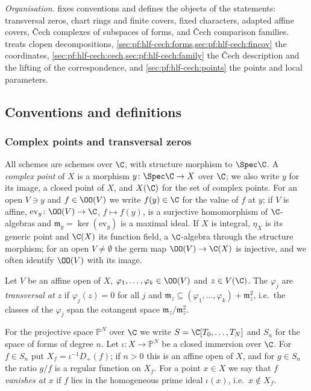 \emph{Organisation.}  fixes conventions and defines the objects of the statements: transversal zeros, chart rings
and finite covers, fixed characters, adapted affine covers, \v{C}ech complexes of subspaces of forms, and \v{C}ech comparison families.
 treats clopen decompositions, \cref{sec:pf:hlf-cech:forms,sec:pf:hlf-cech:fincov} the coordinates,
\cref{sec:pf:hlf-cech:cech,sec:pf:hlf-cech:family} the \v{C}ech description and the lifting of the correspondence, and \cref{sec:pf:hlf-cech:points}
the points and local parameters.

\subsection{Conventions and definitions}\label{sec:pf:hlf-cech:defs}

\subsubsection{Complex points and transversal zeros}
All schemes are schemes over $\C$, with structure morphism to $\Spec\C$. A \emph{complex point} of $X$ is a morphism
$y\colon\Spec\C\to X$ over $\C$; we also write $y$ for its image, a closed point of $X$, and $X(\C)$ for the set of complex points.
For an open $V\ni y$ and $f\in\OO(V)$ we write $f(y)\in\C$ for the value of $f$ at $y$; if $V$ is affine, $\mathrm{ev}_y\colon\OO(V)\to\C$,
$f\mapsto f(y)$, is a surjective homomorphism of $\C$-algebras and $\mathfrak m_y=\ker(\mathrm{ev}_y)$ is a maximal ideal. If $X$ is
integral, $\eta_X$ is its generic point and $\C(X)$ its function field, a $\C$-algebra through the structure morphism; for an open
$V\ne\emptyset$ the germ map $\OO(V)\to\C(X)$ is injective, and we often identify $\OO(V)$ with its image.

\begin{definition}\label{pf:hlf-cech:def:transv}
Let $V$ be an affine open of $X$, $\varphi_1,\dots,\varphi_k\in\OO(V)$ and $z\in V(\C)$. The $\varphi_j$ are \emph{transversal at $z$} if
$\varphi_j(z)=0$ for all $j$ and $\mathfrak m_z\subseteq(\varphi_1,\dots,\varphi_k)+\mathfrak m_z^2$, i.e.\ the classes of the $\varphi_j$
span the cotangent space $\mathfrak m_z/\mathfrak m_z^2$.
\end{definition}

For the projective space $\mathbb P^N$ over $\C$ we write $S=\C[T_0,\dots,T_N]$ and $S_n$ for the space of forms of degree $n$. Let
$\iota\colon X\to\mathbb P^N$ be a closed immersion over $\C$. For $f\in S_n$ put $X_f=\iota^{-1}D_+(f)$; if $n>0$ this is an affine open of
$X$, and for $g\in S_n$ the ratio $g/f$ is a regular function on $X_f$. For a point $x\in X$ we say that $f$ \emph{vanishes at $x$} if
$f$ lies in the homogeneous prime ideal $\iota(x)$, i.e.\ $x\notin X_f$.

